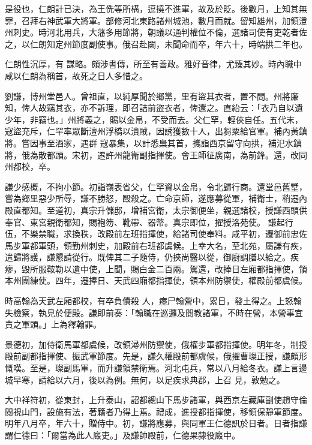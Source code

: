\begin{pinyinscope}
 是役也，仁朗計已決，為王侁等所構，逗撓不進軍，故及於貶。後數月，上知其無罪，召拜右神武軍大將軍。部修河北東路諸州城池，數月而就。留知雄州，加領澄州刺史。時河北用兵，大藩多用節將，朝議以通判權位不倫，選諸司使有吏乾者佐之，以仁朗知定州節度副使事。俄召赴闕，未聞命而卒，年六十，時端拱二年也。



 仁朗性沉厚，有
 謀略。頗涉書傳，所至有善政。雅好音律，尤臻其妙。時內職中咸以仁朗為稱首，故死之日人多惜之。



 劉謙，博州堂邑人。曾祖直，以純厚聞於鄉黨，里有盜其衣者，置不問。州將廉知，俾人故竊其衣，亦不訴理，即召詰前盜衣者，俾還之。直紿云：「衣乃自以遺少年，非竊也。」州將義之，賜以金帛，不受而去。父仁罕，輕俠自任。五代末，寇盜充斥，仁罕率眾斷澶州浮橋以潰賊，因誘獲數十人，出芻粟給官軍。補內黃鎮將。嘗因事至酒家，遇群
 寇暴集，以計悉梟其首，攜詣西京留守向拱，補汜水鎮將，俄為散都頭。宋初，遷許州龍衛副指揮使。會王師征廣南，為前鋒。還，改同州都校，卒。



 謙少感概，不拘小節。初詣嶺表省父，仁罕資以金帛，令北歸行商。還堂邑舊墅，嘗為鄉里惡少所辱，謙不勝怒，毆殺之。亡命京師，遂應募從軍，補衛士，稍遷內殿直都知。至道初，真宗升儲邸，增補宮衛，太宗御便坐，親選諸校，授謙西頭供奉官、東宮親衛都知，賜袍笏、靴帶、器幣。真宗即位，擢授洛苑使。
 謙起行伍，不樂禁職，求換秩，改殿前左班指揮使，給諸司使奉料。咸平初，遷御前忠佐馬步軍都軍頭，領勤州刺史，加殿前右班都虞候。上幸大名，至北苑，屬謙有疾，遣歸將護，謙懇請從行。既俾其二子隨侍，仍挾尚醫以從，御廚調膳以給之。疾瘳，毀所服鞍勒以遺中使，上聞，賜白金二百兩。駕還，改捧日左廂都指揮使，領本州團練使。四年，遷捧日、天武四廂都指揮使，領本州防禦使，權殿前都虞候。



 時高翰為天武左廂都校，有卒負債殺
 人，瘞尸翰營中，累日，發土得之。上怒翰失檢察，執見於便殿。謙即前奏：「翰職在巡邏及閱教諸軍，不時在營，本營事宜責之軍頭。」上為釋翰罪。



 景德初，加侍衛馬軍都虞候，改領潯州防禦使，俄權步軍都指揮使。明年冬，制授殿前副都指揮使、振武軍節度。先是，謙久權殿前都虞候，俄擢曹璨正授，謙頗形慨嘆。至是，璨副馬軍，而升謙領禁衛焉。河北屯兵，常以八月給冬衣。謙上言邊城早寒，請給以六月，後以為例。無何，以足疾求典郡，上召
 見，敦勉之。



 大中祥符初，從東封，上升泰山，詔都總山下馬步諸軍，與西京左藏庫副使趙守倫閱視山門，設施有法，著籍者乃得上焉。禮成，進授都指揮使，移領保靜軍節度。明年八月卒，年六十，贈侍中。初，謙將應募，與同軍王仁德訊於日者。日者指謙謂仁德曰：「爾當為此人廄吏。」及謙帥殿前，仁德果隸役廄中。




\end{pinyinscope}

